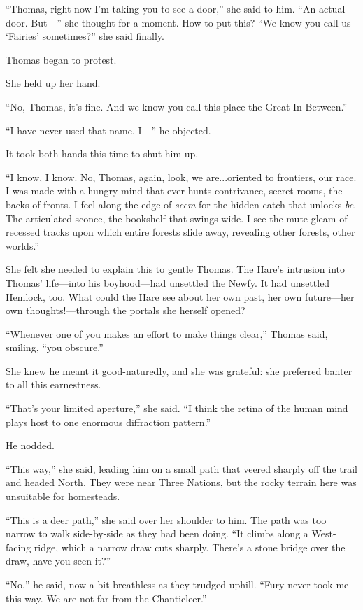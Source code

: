 \documentclass[11pt,a5paper]{article}
\begin{document}
``Thomas, right now I'm taking you to see a door,'' she said to him. ``An actual door. But---'' she thought for a moment. How to put this? ``We know you call us `Fairies' sometimes?'' she said finally.

Thomas began to protest.

She held up her hand.

``No, Thomas, it's fine. And we know you call this place the Great In-Between.''

``I have never used that name. I---'' he objected.

It took both hands this time to shut him up.

``I know, I know. No, Thomas, again, look, we are...oriented to frontiers, our race. I was made with a hungry mind that ever hunts contrivance, secret rooms, the backs of fronts. I feel along the edge of \emph{seem} for the hidden catch that unlocks \emph{be}. The articulated sconce, the bookshelf that swings wide. I see the mute gleam of recessed tracks upon which entire forests slide away, revealing other forests, other worlds.''

She felt she needed to explain this to gentle Thomas. The Hare's intrusion into Thomas' life---into his boyhood---had unsettled the Newfy. It had unsettled Hemlock, too. What could the Hare see about her own past, her own future---her own thoughts!---through the portals she herself opened?

``Whenever one of you makes an effort to make things clear,'' Thomas said, smiling, ``you obscure.''

She knew he meant it good-naturedly, and she was grateful: she preferred banter to all this earnestness.

``That's your limited aperture,'' she said. ``I think the retina of the human mind plays host to one enormous diffraction pattern.''

He nodded.

``This way,'' she said, leading him on a small path that veered sharply off the trail and headed North. They were near Three Nations, but the rocky terrain here was unsuitable for homesteads.

``This is a deer path,'' she said over her shoulder to him. The path was too narrow to walk side-by-side as they had been doing. ``It climbs along a West-facing ridge, which a narrow draw cuts sharply. There's a stone bridge over the draw, have you seen it?''

``No,'' he said, now a bit breathless as they trudged uphill. ``Fury never took me this way. We are not far from the Chanticleer.''
\end{document}
